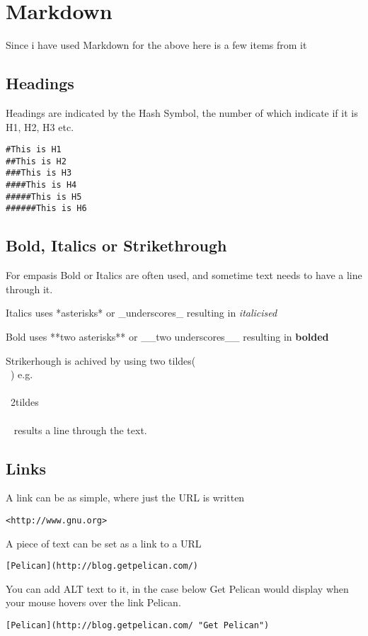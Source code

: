 \documentclass[12pt]{article}			%
\begin{document}
\newpage
\section{Markdown}
Since i have used Markdown for the above here is a few items from it

\subsection{Headings}
Headings are indicated by the Hash Symbol, the number of which indicate if it is H1, H2, H3 etc.
\begin{verbatim}
#This is H1
##This is H2
###This is H3
####This is H4
#####This is H5
######This is H6
\end{verbatim}
\subsection{Bold, Italics or Strikethrough}
For empasis Bold or Italics are often used, and sometime text needs to have a line through it.\par
Italics uses *asterisks* or \_underscores\_ resulting in \textit{italicised} \par
Bold uses **two asterisks** or \_\_two underscores\_\_ resulting in \textbf{bolded} \par


Strikerhough is achived by using two tildes(\\~) e.g. \\~\\~2tildes\\~\\~ results a line through the text.

\subsection{Links}
A link can be as simple, where just the URL is written 
\begin{verbatim}
<http://www.gnu.org>
\end{verbatim}
A piece of text can be set as a link to a URL
\begin{verbatim}
[Pelican](http://blog.getpelican.com/)
\end{verbatim}
You can add ALT text to it, in the case below Get Pelican would display when your mouse hovers over the link Pelican.
\begin{verbatim}
[Pelican](http://blog.getpelican.com/ "Get Pelican")
\end{verbatim}
\end{document}
